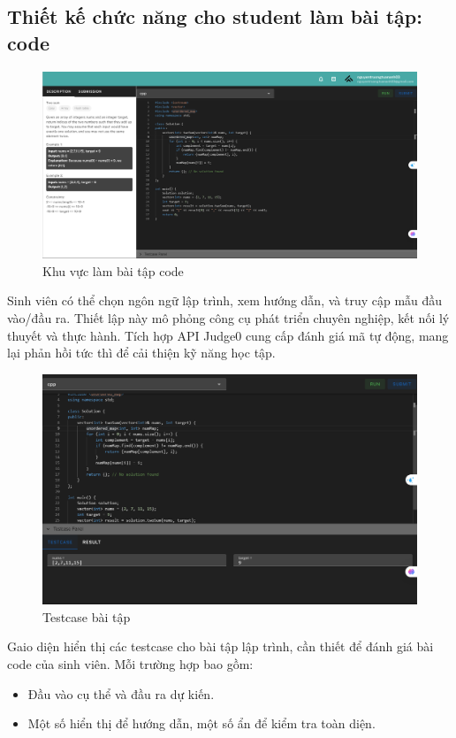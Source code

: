 \subsection{Thiết kế chức năng cho student làm bài tập: code}
\begin{figure}[H]
    \centering
    \includegraphics[width=0.8\linewidth]{images/code_area.png}
    \caption{Khu vực làm bài tập code}
    \label{fig:enter-label}
\end{figure}
Sinh viên có thể chọn ngôn ngữ lập trình, xem hướng dẫn, và truy cập mẫu đầu vào/đầu ra. Thiết lập này mô phỏng công cụ phát triển chuyên nghiệp, kết nối lý thuyết và thực hành. Tích hợp API Judge0 cung cấp đánh giá mã tự động, mang lại phản hồi tức thì để cải thiện kỹ năng học tập.
\begin{figure}[H]
    \centering
    \includegraphics[width=0.8\linewidth]{images/code_testcase.png}
    \caption{Testcase bài tập}
    \label{fig:enter-label}
\end{figure}
Gaio diện hiển thị các testcase cho bài tập lập trình, cần thiết để đánh giá bài code của sinh viên. Mỗi trường hợp bao gồm:
\begin{itemize}
    \item Đầu vào cụ thể và đầu ra dự kiến.
    \item Một số hiển thị để hướng dẫn, một số ẩn để kiểm tra toàn diện.
\end{itemize}

